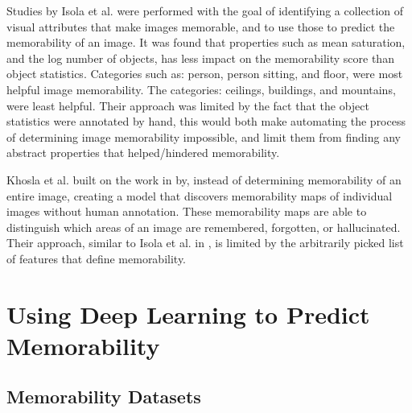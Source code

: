 \documentclass{UoYCSproject}
\begin{document}
Studies by Isola et al. \cite{Isola2011, IsolaParikhTorralbaOliva2011} were performed with the goal of identifying a collection of visual attributes that make images memorable, and to use those to predict the memorability of an image. It was found that properties such as mean saturation, and the log number of objects, has less impact on the memorability score than object statistics. 
Categories such as: person, person sitting, and floor, were most helpful image memorability. The categories: ceilings, buildings, and mountains, were least helpful. Their approach was limited by the fact that the object statistics were annotated by hand, this would both make automating the process of determining image memorability impossible, and limit them from finding any abstract properties that helped/hindered memorability.

Khosla et al. \cite{NIPS12_Khosla} built on the work in \cite{Isola2011, IsolaParikhTorralbaOliva2011} by, instead of determining memorability of an entire image, creating a model that discovers memorability maps of individual images without human annotation. These memorability maps are able to distinguish which areas of an image are remembered, forgotten, or hallucinated. Their approach, similar to Isola et al. in \cite{Isola2011, IsolaParikhTorralbaOliva2011}, is limited by the arbitrarily picked list of features that define memorability.

\section{Using Deep Learning to Predict Memorability}


\subsection{Memorability Datasets}

\end{document}
